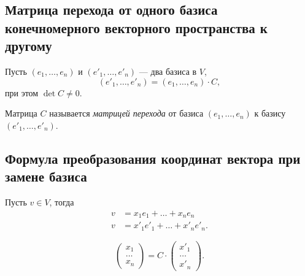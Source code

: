 \subsection{Матрица перехода от одного базиса конечномерного векторного пространства к другому}

Пусть $(e_1, \dots, e_n)$ и $(e'_1, \dots, e'_n)$ --- два базиса в $V$,
\begin{equation*}
    (e'_1, \dots, e'_n) = (e_1, \dots, e_n) \cdot C
,\end{equation*}
при этом $\det C \neq 0$.

\begin{definition}
    Матрица $C$ называется \textit{матрицей перехода} от базиса $(e_1, \dots, e_n)$ к базису $(e'_1, \dots, e'_n)$.
\end{definition}

\begin{comment}
    Матрица перехода от $(e'_1, \dots, e'_n)$ к $(e_1, \dots, e_n)$ --- это $C^{-1}$.
\end{comment}


\subsection{Формула преобразования координат вектора при замене базиса}

Пусть $v \in V$, тогда
\begin{align*}
    v &= x_1 e_1 + \dots + x_n e_n \\
    v &= x'_1 e'_1 + \dots + x'_n e'_n
.\end{align*}

\begin{proposal}
    \begin{equation*}
        \begin{pmatrix} x_1 \\ \dots \\ x_n \end{pmatrix} 
        = C \cdot \begin{pmatrix} x'_1 \\ \dots \\ x'_n \end{pmatrix}
    .\end{equation*}
\end{proposal}

